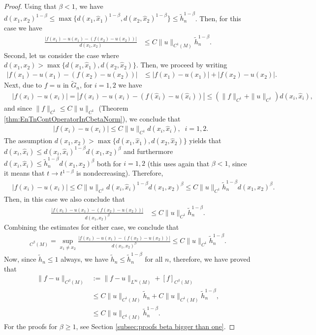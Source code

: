 \documentclass[11pt,reqno]{amsart}
\numberwithin{equation}{section}
\theoremstyle{plain}
\begin{document}
\begin{proof}
  Using that $\beta<1$, we have $d(x_1,x_2)^{1-\beta} \leq \max\{d(x_1,\hat x_1)^{1-\beta},d(x_2,\hat x_2)^{1-\beta} \} \leq \tilde h_n^{1-\beta}$. Then, for this case we have	 
  \begin{align*}	
    \frac{|f(x_1)-u(x_1)-(f(x_2)-u(x_2))|}{d(x_1,x_2)} & \leq C\|u\|_{C^1(M)}\tilde h_n^{1-\beta}.
  \end{align*}
  Second, let us consider the case where $d(x_1,x_2)>\max\{ d(x_1,\hat x_1),d(x_2,\hat x_2)\}$. Then, we proceed by writing
  \begin{align*}
    |f(x_1)-u(x_1)-(f(x_2)-u(x_2))| & \leq |f(x_1)-u(x_1)|+|f(x_2)-u(x_2)|.
  \end{align*}
  Next, due to $f=u$ in $\tilde G_n$, for $i=1,2$ we have
  \begin{align*}
    & |f(x_i)-u(x_i)| = |f(x_i)-u(x_i)-(f(\hat x_i)-u(\hat x_i))| \leq (\|f\|_{C^1}+\|u\|_{C^1})d(x_i,\hat x_i),
  \end{align*}
  and since $\|f\|_{C^1}\leq C\|u\|_{C^1}$ (Theorem \ref{thm:EnTnContOperatorInCbetaNorm}), we conclude that
  \begin{align*}
    & |f(x_i)-u(x_i)|  \leq C\|u\|_{C^1} d(x_i,\hat x_i),\;\;i=1,2.
  \end{align*}
  The assumption $d(x_1,x_2)>\max\{d(x_1,\hat x_1),d(x_2,\hat x_2)\}$ yields that $d(x_i,\hat x_i) \leq d(x_i,\hat x_i)^{1-\beta}d(x_1,x_2)^\beta$ and furthermore $d(x_i,\hat x_i) \leq \tilde h_n^{1-\beta}d(x_1,x_2)^\beta$ both for $i=1,2$ (this uses again that $\beta<1$, since it means that $t\to t^{1-\beta}$ is nondecreasing). Therefore,
  \begin{align*}
    & |f(x_i)-u(x_i)| \leq C\|u\|_{C^1}d(x_i,\hat x_i)^{1-\beta}d(x_1,x_2)^\beta \leq C\|u\|_{C^1}\tilde h_n^{1-\beta}d(x_1,x_2)^\beta.
  \end{align*}
  Then, in this case we also conclude that
  \begin{align*}
    \frac{|f(x_1)-u(x_1)-(f(x_2)-u(x_2))|}{d(x_1,x_2)^{\beta}} & \leq C\|u\|_{C^1}\tilde h_n^{1-\beta}.
  \end{align*}
  Combining the estimates for either case, we conclude that
  \begin{align*}
    [f]_{C^\beta(M)} = \sup \limits_{x_1\neq x_2}\frac{|f(x_1)-u(x_1)-(f(x_2)-u(x_2))|}{d(x_1,x_2)^{\beta}} \leq C\|u\|_{C^1}\tilde h_n^{1-\beta}.
  \end{align*}
  Now, since $\tilde h_n\leq 1$ always, we have $\tilde h_n \leq \tilde h_n^{1-\beta}$ for all $n$, therefore, we have proved that
  \begin{align*}
    \|f-u\|_{C^\beta(M)}  & := \|f-u\|_{L^\infty(M)}+[f]_{C^\beta(M)}\\
	& \leq C\|u\|_{C^1(M)}\tilde h_n+C\|u\|_{C^1(M)}\tilde h_n^{1-\beta},\\
	& \leq C\|u\|_{C^1(M)}\tilde h_n^{1-\beta}.
  \end{align*}
  For the proofs for $\beta \geq 1$, see Section \ref{subsec:proofs beta bigger than one}.

\end{proof}
\end{document}
